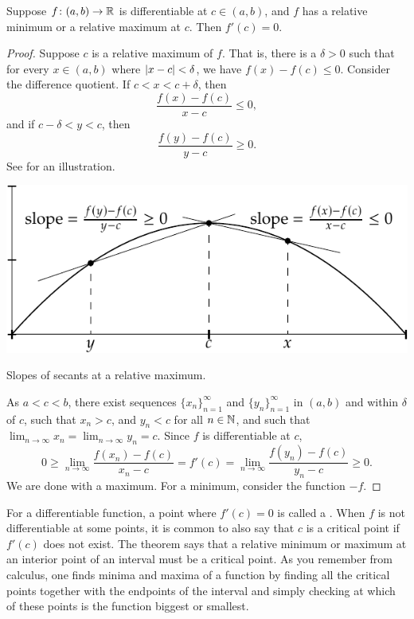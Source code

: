\begin{lemma}\label{relminmax:lemma}
Suppose $f \colon (a,b) \to {\mathbb{R}}$ is differentiable at $c \in (a,b)$,
and $f$ has
a relative minimum or a relative maximum at $c$.  Then
$f'(c) = 0$.
\end{lemma}

\begin{proof}
Suppose $c$ is a 
relative maximum of $f$.  That is, there is a $\delta > 0$ such
that for every $x \in (a,b)$ where
$\left\lvert {x-c} \right\rvert < \delta$, we have $f(x)-f(c) \leq 0$.
Consider the difference
quotient.  If $c < x < c+\delta$, then
\begin{equation*}
\frac{f(x)-f(c)}{x-c} \leq 0 ,
\end{equation*}
and if $c-\delta < y < c$, then
\begin{equation*}
\frac{f(y)-f(c)}{y-c} \geq 0 .
\end{equation*}
See  for an illustration.
\begin{myfigureht}
\includegraphics{figures/critpt}
\caption{Slopes of secants at a relative maximum.\label{fig:critpt}}
\end{myfigureht}

As $a < c < b$, there exist
sequences $\{ x_n \}_{n=1}^\infty$ and
$\{ y_n \}_{n=1}^\infty$ in $(a,b)$ and within $\delta$ of $c$,
such that $x_n > c$, and
$y_n < c$ for all $n \in {\mathbb{N}}$, and such that
$\lim_{n\to\infty} x_n = \lim_{n\to\infty} y_n = c$.
Since $f$
is differentiable at $c$,
\begin{equation*}
0 \geq \lim_{n\to\infty} \frac{f(x_n)-f(c)}{x_n-c} 
=
f'(c)
=
\lim_{n\to\infty} \frac{f(y_n)-f(c)}{y_n-c} \geq 0.
\end{equation*}
We are done with a maximum.
For a minimum, consider
the function $-f$.
\end{proof}

For a differentiable function, a point where 
$f'(c) = 0$ is called a \emph{}.  When $f$ is not
differentiable at some points,
it is common to also say that $c$ is a critical point
if $f'(c)$ does not exist.
The theorem says that a relative minimum or maximum at an interior point
of an interval must be a critical point.
As you remember from calculus, one finds minima and maxima of a function
by finding all the critical points together with the endpoints of
the interval and simply checking at which of these points
is the function biggest or smallest.


